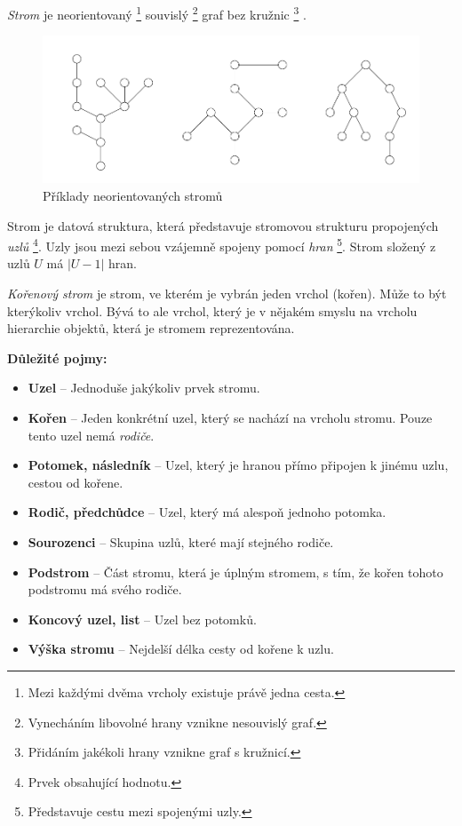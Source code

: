 \documentclass[
  biblatex=false,
  font=serif,
  glossaries=false,
  tables=false,
  theorems=false,
  index
]{kidiplom}
\begin{document}
\begin{definition}[Strom]
\textit{Strom} je neorientovaný \footnote{Mezi každými dvěma vrcholy existuje právě jedna cesta.} souvislý \footnote{Vynecháním libovolné hrany vznikne nesouvislý graf.} graf bez kružnic \footnote{Přidáním jakékoli hrany vznikne graf s kružnicí.} \cite{belohlavekALM}.
\end{definition}
\begin{figure}[h!]
\centering
	\includegraphics[scale=0.6]{obrazky/1Stromy.png}
	\caption{Příklady neorientovaných stromů}
\end{figure}

\medskip
Strom je datová struktura, která představuje stromovou strukturu propojených \textit{uzlů} \footnote{Prvek obsahující hodnotu.}. Uzly jsou mezi sebou vzájemně spojeny pomocí \textit{hran} \footnote{Představuje cestu mezi spojenými uzly.}. Strom složený z uzlů $U$ má $|U - 1|$ hran.


\begin{definition}
\textit{Kořenový strom} je strom, ve kterém je vybrán jeden vrchol (kořen). Může to být kterýkoliv vrchol. Bývá to ale vrchol, který je v nějakém smyslu na vrcholu hierarchie objektů, která je stromem reprezentována.
\cite{belohlavekALM}
\end{definition}
\smallskip

\newpage
\noindent \textbf{Důležité pojmy:}
\begin{itemize}
\item \textbf{Uzel} -- Jednoduše jakýkoliv prvek stromu.
\item \textbf{Kořen} -- Jeden konkrétní uzel, který se nachází na vrcholu stromu. Pouze tento uzel nemá \textit{rodiče}. 
\item \textbf{Potomek, následník} -- Uzel, který je hranou přímo připojen k jinému uzlu, cestou od kořene.
\item \textbf{Rodič, předchůdce} -- Uzel, který má alespoň jednoho potomka.
\item \textbf{Sourozenci} -- Skupina uzlů, které mají stejného rodiče.
\item \textbf{Podstrom} -- Část stromu, která je úplným stromem, s tím, že kořen tohoto podstromu má svého rodiče.
\item \textbf{Koncový uzel, list} -- Uzel bez potomků. 
\item \textbf{Výška stromu} -- Nejdelší délka cesty od kořene k uzlu.
\end{itemize} 
\end{document}
